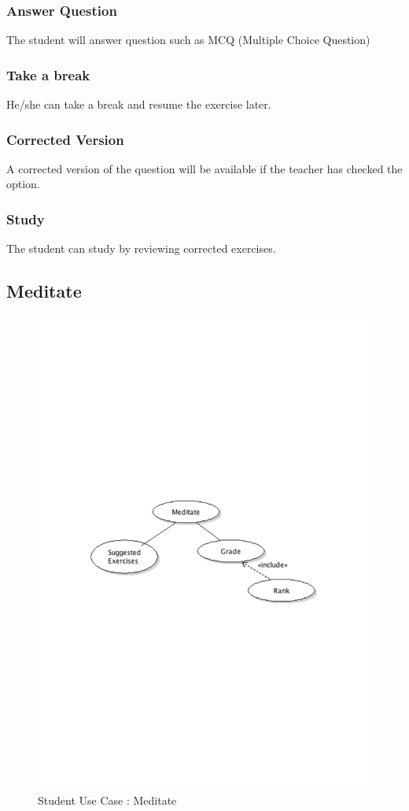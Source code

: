 		\subsubsection{Answer Question}
			The student will answer question such as MCQ (Multiple Choice Question)
		\subsubsection{Take a break}
			He/she can take a break and resume the exercise later.
		\subsubsection{Corrected Version}
			A corrected version of the question will be available if the teacher has checked the option.
		\subsubsection{Study}
			The student can study by reviewing corrected exercises.
	\subsection{Meditate}
		\begin{figure}[ht]
			\begin{center}
				\includegraphics[width=\textwidth,  trim=2cm 10cm 2cm 11cm]{UML_figure/UC/student/UC_Student_Meditate.pdf}
				\caption{Student Use Case : Meditate}
			\end{center}
		\end{figure}
